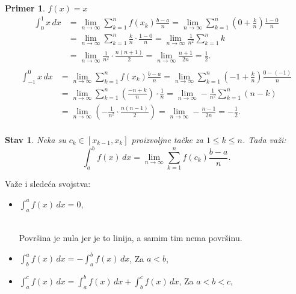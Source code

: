 \documentclass[11pt]{article}
\newcounter{mathitem}
\theoremstyle{plain}
\newtheorem{primer}[mathitem]{Primer}
\newtheorem{stav}[mathitem]{Stav}
\theoremstyle{serbnodot}
\begin{document}
\begin{primer}
  \( f(x) = x \) \\
  \begin{align*}
    \int_{0}^{1} x \, dx &= \lim_{n \to \infty} \sum_{k=1}^{n} f(x_k) \frac{b-a}{n} = \lim_{n \to \infty} \sum_{k=1}^{n} \left(0 + \frac{k}{n}\right) \frac{1-0}{n} \\
    &= \lim_{n \to \infty} \sum_{k=1}^{n} \frac{k}{n} \cdot \frac{1-0}{n} = \lim_{n \to \infty} \frac{1}{n^2} \sum_{k=1}^{n} k \\
    &= \lim_{n \to \infty} \frac{1}{n^2} \cdot \frac{n(n+1)}{2} = \lim_{n \to \infty} \frac{n+1}{2n} = \frac{1}{2}. \\
  \end{align*}
  \begin{align*}
  \int_{-1}^{0} x \, dx &= \lim_{n \to \infty} \sum_{k=1}^{n} f(x_k) \frac{b-a}{n} = \lim_{n \to \infty} \sum_{k=1}^{n} \left(-1 + \frac{k}{n}\right) \frac{0-(-1)}{n} \\
    &= \lim_{n \to \infty} \sum_{k=1}^{n} \left(\frac{-n + k}{n}\right) \cdot \frac{1}{n} = \lim_{n \to \infty} -\frac{1}{n^2} \sum_{k=1}^{n} (n - k) \\
    &= \lim_{n \to \infty}  \left( -\frac{1}{n^2} \cdot \frac{n(n-1)}{2} \right) = \lim_{n \to \infty} -\frac{n-1}{2n} = -\frac{1}{2}. \\
  \end{align*}
\end{primer}

\begin{stav}
  Neka su \( c_k \in [x_{k-1}, x_k] \) proizvoljne tačke za \( 1 \leq k \leq n \). Tada važi:
  \[
    \int_{a}^{b} f(x) \, dx = \lim_{n \to \infty} \sum_{k=1}^{n} f(c_k) \frac{b - a}{n}.
  \]
\end{stav}

\newpage
Važe i sledeća svojstva:
\begin{itemize}
  \item \( \int_{a}^{a} f(x) \, dx = 0 \),
  \begin{center}
 \\
Površina je nula jer je to linija, a samim tim nema površinu.
\end{center}
  \item \( \int_{b}^{a} f(x) \, dx = - \int_{a}^{b} f(x) \, dx \), \quad Za \( a < b\),
  \item \( \int_{a}^{c} f(x) \, dx = \int_{a}^{b} f(x) \, dx + \int_{b}^{c} f(x) \, dx \), \quad Za \( a < b < c\),
\end{itemize}
\end{document}
